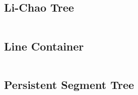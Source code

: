 
\subsection{Li-Chao Tree} %
\inputminted{cpp}{src/DS/lichao.cpp}

\subsection{Line Container} %
\inputminted{cpp}{src/DS/linecontainer.cpp}

\subsection{Persistent Segment Tree}
\inputminted{cpp}{src/DS/pst.cpp}


